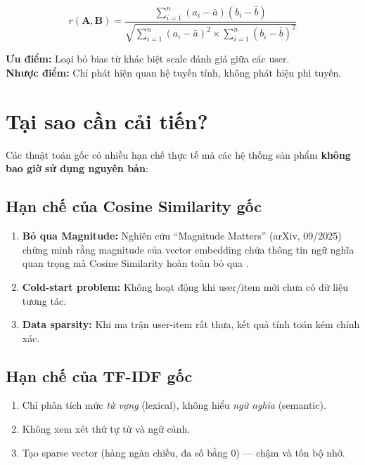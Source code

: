 \documentclass[12pt,a4paper]{article}
\begin{document}
\begin{equation}
r(\mathbf{A}, \mathbf{B}) = \frac{\sum_{i=1}^{n}(a_i - \bar{a})(b_i - \bar{b})}{\sqrt{\sum_{i=1}^{n}(a_i - \bar{a})^2 \times \sum_{i=1}^{n}(b_i - \bar{b})^2}}
\label{eq:pearson}
\end{equation}

\noindent\textbf{Ưu điểm:} Loại bỏ bias từ khác biệt scale đánh giá giữa các user.\\
\noindent\textbf{Nhược điểm:} Chỉ phát hiện quan hệ tuyến tính, không phát hiện phi tuyến.

\section{Tại sao cần cải tiến?}

Các thuật toán gốc có nhiều hạn chế thực tế mà các hệ thống sản phẩm \textbf{không bao giờ sử dụng nguyên bản}:

\subsection{Hạn chế của Cosine Similarity gốc}
\begin{enumerate}[noitemsep]
    \item \textbf{Bỏ qua Magnitude:} Nghiên cứu ``Magnitude Matters'' (arXiv, 09/2025) chứng minh rằng magnitude của vector embedding chứa thông tin ngữ nghĩa quan trọng mà Cosine Similarity hoàn toàn bỏ qua \cite{magnitude2025}.
    \item \textbf{Cold-start problem:} Không hoạt động khi user/item mới chưa có dữ liệu tương tác.
    \item \textbf{Data sparsity:} Khi ma trận user-item rất thưa, kết quả tính toán kém chính xác.
\end{enumerate}

\subsection{Hạn chế của TF-IDF gốc}
\begin{enumerate}[noitemsep]
    \item Chỉ phân tích mức \textit{từ vựng} (lexical), không hiểu \textit{ngữ nghĩa} (semantic).
    \item Không xem xét thứ tự từ và ngữ cảnh.
    \item Tạo sparse vector (hàng ngàn chiều, đa số bằng 0) --- chậm và tốn bộ nhớ.
\end{enumerate}
\end{document}
